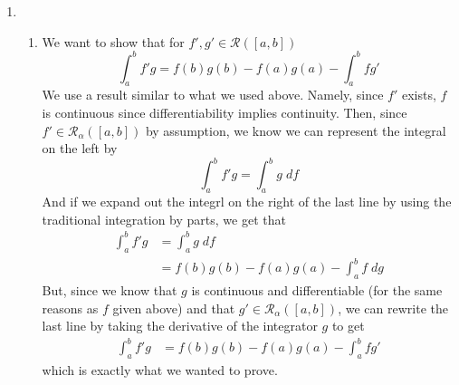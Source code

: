 \documentclass[12pt]{article}
\theoremstyle{plain}
\theoremstyle{definition}
\theoremstyle{remark}
\begin{document}
\begin{enumerate}
\begin{enumerate}
\begin{enumerate}
    
\end{enumerate}


\end{enumerate}



\newpage    
\item  
\begin{enumerate}
\item
We want to show that for $f', g'\in\mathscr{R}([a,b])$
\begin{equation}
    \int^b_a f'g = f(b)g(b) - f(a)g(a) - \int^b_a f g'
\end{equation}
We use a result similar to what we used above. Namely, since $f'$ exists, $f$ is continuous since differentiability implies continuity. Then, since $f'\in\mathscr{R}_\alpha([a,b])$ by assumption, we know we can represent the integral on the left by
\[ 
    \int^b_a f' g = \int^b_a g \; df 
\]
And if we expand out the integrl on the right of the last line by using the traditional integration by parts, we get that
\begin{align*}
    \int^b_a f' g &= \int^b_a g \; df \\
    &= f(b)g(b) - f(a)g(a) - \int^b_a f\;dg
\end{align*}
But, since we know that $g$ is continuous and differentiable (for the same reasons as $f$ given above) and that $g'\in\mathscr{R}_\alpha([a,b])$, we can rewrite the last line by taking the derivative of the integrator $g$ to get
\begin{align*}
    \int^b_a f' g &= 
     f(b)g(b) - f(a)g(a) - \int^b_a fg'
\end{align*}
which is exactly what we wanted to prove.

\end{enumerate}
        
        

\end{enumerate}
\end{document}

